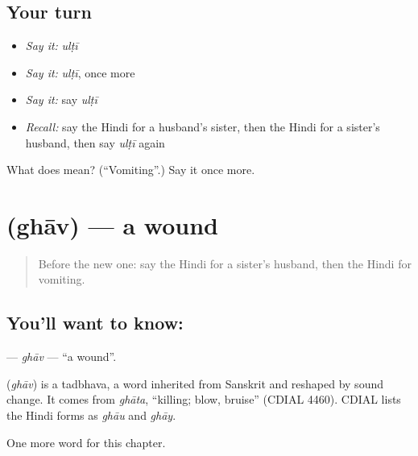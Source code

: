 \subsection*{Your turn}
\begin{itemize}
\raggedright
  \item \emph{Say it:} \emph{ulṭī}
  \item \emph{Say it:} \emph{ulṭī}, once more
  \item \emph{Say it:} say \emph{ulṭī}
  \item \emph{Recall:} say the Hindi for a husband's sister, then the Hindi for a sister's husband, then say \emph{ulṭī} again
\end{itemize}

\begin{tcolorbox}[breakable,colback=teal!4,colframe=teal!35!black,title={Before you move on}]
What does  mean? (\textquotedblleft{}Vomiting\textquotedblright{}.) Say it once more.
\end{tcolorbox}
\section[\texorpdfstring{\hi{घाव} (ghāv)}{घाव (ghāv)}]{ (ghāv) — a wound}

\label{lesson:HI-C256-ghav}



\begin{quote}
Before the new one: say the Hindi for a sister's husband, then the Hindi for vomiting.
\end{quote}

\subsection*{You'll want to know: }
\textbf{} — \emph{ghāv} — \textquotedblleft{}a wound\textquotedblright{}.

\begin{cousinweb}
\textbf{} (\emph{ghāv}) is a tadbhava, a word inherited from Sanskrit and reshaped by sound change. It comes from \emph{ghāta}, \textquotedblleft{}killing; blow, bruise\textquotedblright{} (CDIAL 4460). CDIAL lists the Hindi forms as \emph{ghāu} and \emph{ghāy}.
\end{cousinweb}

\begin{grammarlens}[title={What you've built}]
One more word for this chapter.
\end{grammarlens}

